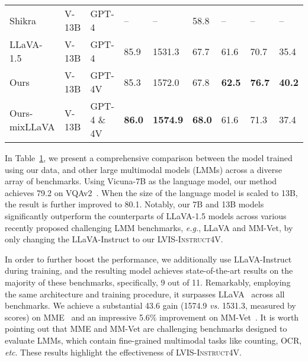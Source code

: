 \documentclass{article}
\makeatletter
\newcommand{\system}{Ours\xspace}
\newcommand{\dataname}{\textsc{LVIS-Instruct4V}\xspace}
\newcommand*{\eg}{\emph{e.g.}\@\xspace}
\newcommand*{\etc}{\emph{etc}\@\xspace}
\newcommand*{\vs}{\emph{vs.}\@\xspace}
\makeatother
\begin{document}
\begin{table}[t!]
\begin{subtable}{\linewidth}
{\begin{tabular}{p{24mm} p{10mm} p{16mm}|p{8mm} p{8mm}p{8mm} p{10mm} p{10mm} l }
    Shikra~\cite{chen2023shikra} & {\footnotesize V-13B} & GPT-4 & -- & -- & 58.8  & -- & -- & -- \\
    LLaVA-1.5~\cite{liu2023improved} & {\footnotesize V-13B} & GPT-4  & 85.9 & 1531.3 & 67.7 & 61.6 & 70.7 & 35.4 \\
    \midrule
    \rowcolor{Gray}
    \system & {\footnotesize V-13B} & GPT-4V & 85.3 & 1572.0 & 67.8 & \textbf{62.5} & \textbf{76.7} & \textbf{40.2} \\
    \rowcolor{Gray}
    \system-mixLLaVA & {\footnotesize V-13B} & GPT-4 \& 4V & \textbf{86.0} & \textbf{1574.9} & \textbf{68.0}  & 61.6 & 71.3 & 37.4 \\
    \bottomrule
    \end{tabular}}
    \label{tab:benchmark_llmbench}
    \end{subtable}
\label{tab:benchmark}
\end{table}

In Table~\ref{tab:benchmark}, we present a comprehensive comparison between the model trained using our data, and other large multimodal models (LMMs) across a diverse array of benchmarks. Using Vicuna-7B as the language model, our method achieves 79.2 on VQAv2~\cite{goyal2017vqav2}. When the size of the language model is scaled to 13B, the result is further improved to 80.1. Notably, our 7B and 13B models significantly outperform the counterparts of LLaVA-1.5 models across various recently proposed challenging LMM benchmarks, \eg, LLaVA and MM-Vet, by only changing the LLaVA-Instruct to our \dataname.

In order to further boost the performance, we additionally use LLaVA-Instruct during training, and the resulting model achieves state-of-the-art results on the majority of these benchmarks, specifically, 9 out of 11. Remarkably, employing the same architecture and training procedure, it surpasses LLaVA~\cite{liu2023improved} across all benchmarks. We achieve a substantial 43.6 gain (1574.9 \vs 1531.3, measured by scores) on MME~\cite{fu2023mme} and an impressive 5.6\% improvement on MM-Vet~\cite{yu2023mmvet}. It is worth pointing out that MME and MM-Vet are challenging benchmarks designed to evaluate LMMs, which contain fine-grained multimodal tasks like counting, OCR, \etc. These results highlight the effectiveness of \dataname.
\end{document}
